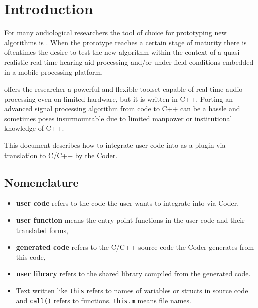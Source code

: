 \documentclass[11pt,a4paper,twoside]{article}
\newcommand{\+}{\discretionary{\mbox{\scriptsize$\hookleftarrow$}}{}{}}
\begin{document}
\newpage
\MHAcopyright{}
\newpage
\tableofcontents
\newpage
{}
\section{Introduction}
\label{section:Introduction}

For many audiological researchers the tool of choice for prototyping new algorithms is \Matlab{}.
When the prototype reaches a certain stage of maturity there is oftentimes the desire to test
the new algorithm within the context of a quasi realistic real-time hearing aid processing and/or
under field conditions embedded in a mobile processing platform.

\mha{} offers the researcher a powerful and flexible toolset capable of real-time audio processing
even on limited hardware, but it is written in C++. Porting an advanced signal processing algorithm
from \Matlab{} code to C++ can be a hassle and sometimes poses insurmountable due to limited manpower
or institutional knowledge of C++. 


This document describes how to integrate user \Matlab{} code into \mha{}
as a plugin via translation to C/C++ by the \Matlab{} Coder.


\subsection*{Nomenclature}
\begin{itemize}
\item \textbf{user code} refers to the \Matlab{} code the user wants to integrate
  into \mha{} via \Matlab{} Coder,
\item \textbf{user function} means the entry point functions in the user code and
  their translated forms,
\item \textbf{generated code} refers to the C/C++ source code the
  Coder generates from this code,
\item \textbf{user library} refers to the shared library compiled
  from the generated code.
\item Text written like \texttt{this} refers to names of variables or structs in
  source code and \texttt{call()} refers to functions. \texttt{this.m} means
  file names.
\end{itemize}
\end{document}

